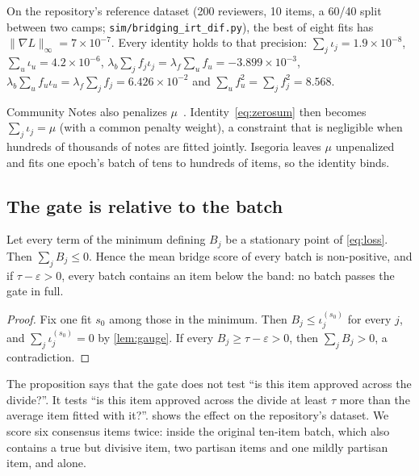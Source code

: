 On the repository's reference dataset (200 reviewers, 10 items, a 60/40 split between two
camps; \texttt{sim/bridging\_irt\_dif.py}), the best of eight fits has
$\|\nabla L\|_\infty=7\times10^{-7}$. Every identity holds to that precision:
$\sum_j\iota_j=1.9\times10^{-8}$, $\sum_u\iota_u=4.2\times10^{-6}$,
$\lambda_b\sum_jf_j\iota_j=\lambda_f\sum_uf_u=-3.899\times10^{-3}$,
$\lambda_b\sum_uf_u\iota_u=\lambda_f\sum_jf_j=6.426\times10^{-2}$ and
$\sum_uf_u^2=\sum_jf_j^2=8.568$.

Community Notes also penalizes $\mu$~\cite{wojcik2022birdwatch}. Identity~\eqref{eq:zerosum}
then becomes $\sum_j\iota_j=\mu$ (with a common penalty weight), a constraint that is negligible
when hundreds of thousands of notes are fitted jointly. Isegoria leaves $\mu$ unpenalized and
fits one epoch's batch of tens to hundreds of items, so the identity binds.

\subsection{The gate is relative to the batch}

\begin{proposition}\label{prop:zerosum}\proved{}
Let every term of the minimum defining $B_j$ be a stationary point of \eqref{eq:loss}. Then
$\sum_j B_j\le 0$. Hence the mean bridge score of every batch is non-positive, and if
$\tau-\varepsilon>0$, every batch contains an item below the band: no batch passes the gate in
full.
\end{proposition}
\begin{proof}
Fix one fit $s_0$ among those in the minimum. Then $B_j\le\iota_j^{(s_0)}$ for every $j$, and
$\sum_j\iota_j^{(s_0)}=0$ by \cref{lem:gauge}. If every $B_j\ge\tau-\varepsilon>0$, then
$\sum_jB_j>0$, a contradiction.
\end{proof}

The proposition says that the gate does not test ``is this item approved across the divide?''.
It tests ``is this item approved across the divide at least $\tau$ more than the average
item fitted with it?''.  shows the effect on the repository's dataset. We
score six consensus items twice: inside the original ten-item batch, which also contains a
true but divisive item, two partisan items and one mildly partisan item, and alone.

